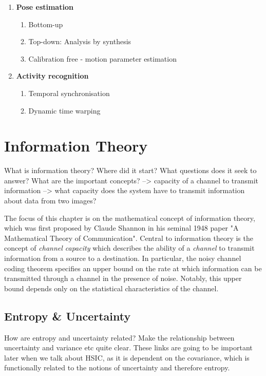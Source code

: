 \begin{enumerate}
\item{\textbf{Pose estimation}}
  \begin{enumerate}
    \item{Bottom-up}
    \item{Top-down: Analysis by synthesis}
    \item{Calibration free - motion parameter estimation}
  \end{enumerate}

\item{\textbf{Activity recognition}}
  \begin{enumerate}
    \item{Temporal synchronisation}
    \item{Dynamic time warping}
  \end{enumerate}
\end{enumerate}





\section{Information Theory}



What is information theory? Where did it start? What questions does it seek to answer? What are the important concepts?
--> capacity of a channel to transmit information
--> what capacity does the system have to transmit information about data from two images?

The focus of this chapter is on the mathematical concept of information theory, which was first proposed by Claude Shannon in his seminal 1948 paper "A Mathematical Theory of Communication". Central to information theory is the concept of \textit{channel capacity} which describes the ability of a \textit{channel} to transmit information from a source to a destination. In particular, the noisy channel coding theorem specifies an upper bound on the rate at which information can be transmitted through a channel in the presence of noise. Notably, this upper bound depends only on the statistical characteristics of the channel. 

\subsection{Entropy \& Uncertainty}

How are entropy and uncertainty related? Make the relationship between uncertainty and variance etc quite clear. These links are going to be important later when we talk about HSIC, as it is dependent on the covariance, which is functionally related to the notions of uncertainty and therefore entropy.

